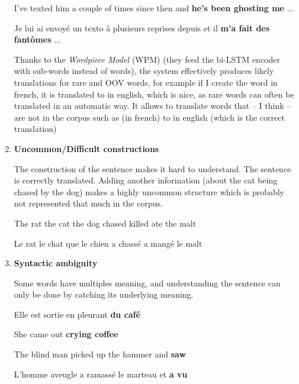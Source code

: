 \documentclass[a4paper, 11pt]{article}
\newcommand{\itemi}[1]{\item{\textbf{#1}}}
\begin{document}
\begin{enumerate}
  \begin{inputcbox}
    I've texted him a couple of times since then and \textbf{he's been ghosting me} ...
  \end{inputcbox}
  \begin{outputcbox}
    Je lui ai envoyé un texto à plusieurs reprises depuis et il \textbf{m'a fait des fantômes} ...
  \end{outputcbox}

  Thanks to the \emph{Wordpiece Model} (WPM) (they feed the bi-LSTM
  encoder with sub-words instead of words), the system effectively
  produces likely translations for rare and OOV words, for example if
  I create the word  in french, it is translated to
   in english, which is nice, as rare words can often
  be translated in an automatic way.  It allows to translate words
  that -- I think -- are not in the corpus such as 
  (in french) to  in english (which is the correct
  translation)

  \itemi{Uncommon/Difficult constructions}

  The construction of the sentence makes it hard to understand.  The
  sentence  is correctly
  translated. Adding another information (about the cat being chased
  by the dog) makes a highly uncommon structure which is probably not
  represented that much in the corpus.

  \begin{inputcbox}
    The rat the cat the dog chased killed ate the malt
  \end{inputcbox}
  \begin{outputcbox}
    Le rat le chat que le chien a chassé a mangé le malt
  \end{outputcbox}

  \itemi{Syntactic ambiguity}

  Some words have multiples meaning, and understanding the sentence
  can only be done by catching its underlying meaning.

  \begin{inputcbox}
    Elle est sortie en pleurant \textbf{du café}
  \end{inputcbox}
  \begin{outputcbox}
    She came out \textbf{crying coffee}
  \end{outputcbox}

  \begin{inputcbox}
    The blind man picked up the hammer and \textbf{saw}
  \end{inputcbox}
  \begin{outputcbox}
    L'homme aveugle a ramassé le marteau et \textbf{a vu}
  \end{outputcbox}


\end{enumerate}
\end{document}
